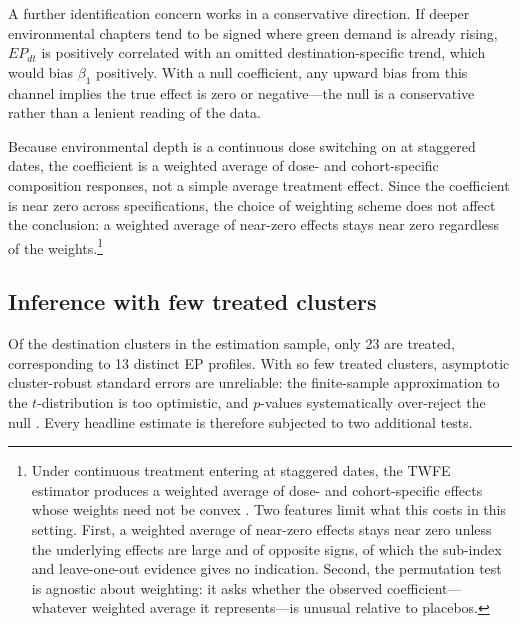 \documentclass[12pt]{article}
\begin{document}
A further identification concern works in a conservative direction. If deeper
environmental chapters tend to be signed where green demand is already rising,
$EP_{dt}$ is positively correlated with an omitted destination-specific trend,
which would bias $\beta_1$ positively. With a null coefficient, any upward bias from this channel implies the true effect is zero or negative---the null is a conservative rather than a lenient reading of the data.

Because environmental depth is a continuous dose switching on at staggered dates,
the coefficient is a weighted average of dose- and cohort-specific composition
responses, not a simple average treatment effect. Since the coefficient is near zero across specifications, the choice of weighting scheme does not affect the conclusion: a weighted average of near-zero effects stays near zero regardless of the weights.\footnote{Under continuous treatment entering at
staggered dates, the TWFE estimator produces a weighted average of dose- and
cohort-specific effects whose weights need not be convex
\citep{callaway2024, goodmanbacon2021, dechaisemartin2020}. Two features limit
what this costs in this setting. First, a weighted average of near-zero effects
stays near zero unless the underlying effects are large and of opposite signs, of
which the sub-index and leave-one-out evidence gives no indication. Second, the
permutation test is agnostic about weighting: it asks whether the observed
coefficient---whatever weighted average it represents---is unusual relative to
placebos.}

\subsection{Inference with few treated clusters}\label{sec:inference}

Of the destination clusters in the estimation sample, only 23 are treated,
corresponding to 13 distinct EP profiles. With so few treated
clusters, asymptotic cluster-robust standard errors are unreliable: the
finite-sample approximation to the $t$-distribution is too optimistic, and
$p$-values systematically over-reject the null
\citep{cameron2008, mackinnon2017}. Every headline estimate is therefore subjected
to two additional tests.
\end{document}
